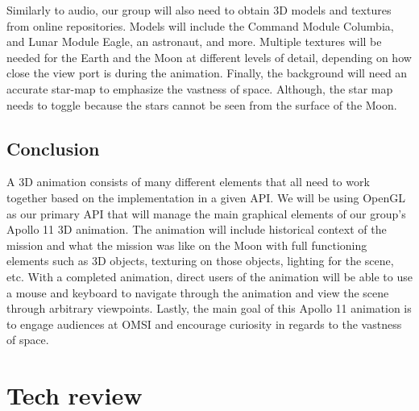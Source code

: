 \documentclass[onecolumn, draftclsnofoot,10pt, compsoc]{IEEEtran}
\begin{document}
    Similarly to audio, our group will also need to obtain 3D models and textures from online repositories. Models will include the Command Module Columbia, and Lunar Module Eagle, an astronaut, and more. Multiple textures will be needed for the Earth and the Moon at different levels of detail, depending on how close the view port is during the animation. Finally, the background will need an accurate star-map to emphasize the vastness of space. Although, the star map needs to toggle because the stars cannot be seen from the surface of the Moon. 
    
\subsection{Conclusion}
A 3D animation consists of many different elements that all need to work together based on the implementation in a given API. We will be using OpenGL as our primary API that will manage the main graphical elements of our group's Apollo 11 3D animation. The animation will include historical context of the mission and what the mission was like on the Moon with full functioning elements such as 3D objects, texturing on those objects, lighting for the scene, etc. With a completed animation, direct users of the animation will be able to use a mouse and keyboard to navigate through the animation and view the scene through arbitrary viewpoints. Lastly, the main goal of this Apollo 11 animation is to engage audiences at OMSI and encourage curiosity in regards to the vastness of space. 

\section{Tech review}
\end{document}
